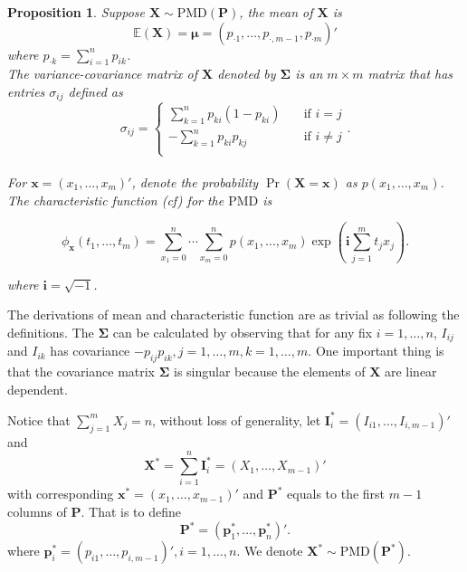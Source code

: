 \documentclass[12pt]{article}
\newcommand{\Ivec}{{\boldsymbol{I}}}
\newcommand{\EE}{\mathbb{E}}
\newcommand{\Xmat}{\mathbf{X}}
\newcommand{\Pmat}{\mathbf{P}}
\newcommand{\pvec}{\boldsymbol{p}}
\newcommand{\ivec}{{\boldsymbol{i}}}
\newcommand{\PMD}{\textrm{PMD}}
\newcommand{\Xvec}{\boldsymbol{X}}
\newcommand{\xvec}{\boldsymbol{x}}
\newcommand{\muvec}{\boldsymbol{\mu}}
\newcommand{\Sig}{\boldsymbol{\Sigma}}
\newcommand{\qedw}{\hfill \ensuremath{\Box}}
\newtheorem{ppt}{Proposition}
\begin{document}
\begin{ppt}%
Suppose $\Xmat \sim \PMD (\Pmat)$, the mean of $\Xmat$ is
   $$\EE(\Xmat) = \muvec = \left( p_{\cdot1} ,\dots,p_{\cdot,m-1},p_{\cdot m}\right)'$$ where $p_{\cdot k} = \sum_{i=1}^{n}p_{i k}$.\\
The variance-covariance matrix of $\Xmat$ denoted by $\Sig$ is an $m \times m$ matrix that has entries $\sigma_{ij}$ defined as
\begin{equation*}
   \sigma_{ij} =
           \begin{cases}
             \sum_{k=1}^{n}p_{ki}(1-p_{ki}) & \quad \text{if } i=j\\
             -\sum_{k=1}^{n}p_{ki}p_{kj} & \quad \text{if } i \neq j\\
           \end{cases}.
\end{equation*}\\
For $\xvec = (x_1, \dots, x_m)'$, denote the probability $\Pr \left(\Xmat = \xvec \right)$ as $p(x_1,\ldots,x_{m})$. The characteristic function (cf) for the $\PMD$ is

\begin{equation*}
\phi_{\xvec}(t_1, \dots, t_{m})  =  \sum_{x_1 = 0}^{n} \cdots \sum_{x_{m} = 0}^n p(x_1,\ldots,x_{m})\exp\left(\ivec\sum_{j=1}^{m}t_jx_j\right).
\end{equation*}

where  $\ivec=\sqrt{-1}$.
\end{ppt}
The derivations of mean and characteristic function are as trivial as following the definitions. The $\Sig$ can be calculated by observing that for any fix $i=1,\dots,n$, $I_{ij}$ and $I_{ik}$ has covariance $-p_{ij}p_{ik},j=1,\dots,m,k=1,\dots,m$. One important thing is that the covariance matrix $\Sig$ is singular because the elements of $\Xvec$ are linear dependent.

Notice that $\sum_{j=1}^{m}X_j = n$, without loss of generality, let $\Ivec_i^{\ast} = (I_{i1},\dots,I_{i,m-1})'$ and
 $$\Xvec^{\ast}=\sum_{i=1}^{n}\Ivec_{i}^{\ast}=(X_1,\dots,X_{m-1})'$$
  with corresponding $\xvec^{\ast} = (x_1,\dots,x_{m-1})'$ and $\Pmat^{\ast}$ equals to the first $m-1$ columns of $\Pmat$. That is to define
$$
\Pmat^{\ast} = \left(\pvec_1^{\ast},\dots, \pvec_n^{\ast} \right)'.
$$
where $\pvec_{i}^{\ast} = \left(p_{i1},\dots,p_{i,m-1} \right)', i = 1,\dots,n$. We denote $\Xvec^{\ast} \sim \PMD(\Pmat^{\ast})$.
\end{document}
